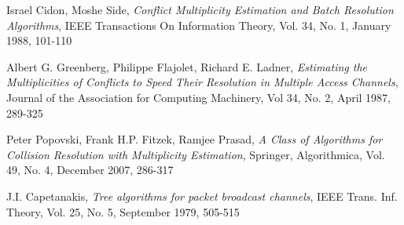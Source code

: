 \begin{thebibliography}{99}
 
 Israel Cidon, Moshe Side, \emph{Conflict Multiplicity Estimation and Batch Resolution Algorithms}, IEEE Transactions On Information Theory, Vol. 34, No. 1, January 1988, 101-110
 
  Albert G. Greenberg, Philippe Flajolet,  Richard E. Ladner,
  \emph{Estimating the Multiplicities of Conflicts to Speed Their Resolution in Multiple Access Channels},
  Journal of the Association for Computing Machinery,
  Vol 34, No. 2, April 1987, 289-325
  
  Peter Popovski, Frank H.P. Fitzek, Ramjee Prasad, \emph{ A Class of Algorithms for Collision Resolution with Multiplicity Estimation}, Springer, Algorithmica, Vol. 49, No. 4, December 2007, 286-317
 
  J.I. Capetanakis, \emph{ Tree algorithms for packet broadcast channels}, IEEE Trans. Inf. Theory, Vol. 25, No. 5, September 1979, 505-515
 \end{thebibliography}